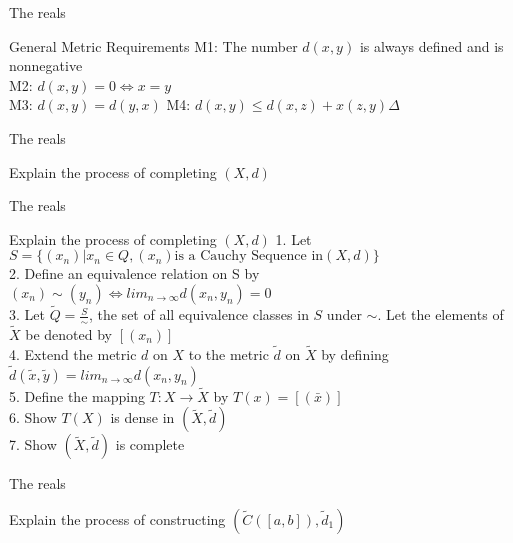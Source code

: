 \documentclass{beamer}
\begin{document}
\begin{frame}{The reals}
        \begin{block}{General Metric Requirements}
		M1: The number $d(x,y)$ is always defined and is nonnegative\\
		M2: $d(x,y) = 0 \iff x = y$\\
		M3: $d(x,y) = d(y,x)$
		M4: $d(x,y) \leq d(x,z) + x(z,y) \Delta$
        \end{block}
\end{frame}

\begin{frame}{The reals}
        \begin{block}{Explain the process of completing $(X,d)$}
        \end{block}
\end{frame}

\begin{frame}{The reals}
        \begin{block}{Explain the process of completing $(X,d)$}
                1. Let $S = \{(x_n)|x_n \in Q, (x_n) \text{is a Cauchy Sequence in} (X,d)\}$\\
                2. Define an equivalence relation on S by $(x_n) \sim (y_n) \iff lim_{n \rightarrow \infty} d(x_n,y_n) =0$\\
                3. Let $\widetilde{Q} = \frac{S}{\sim}$, the set of all equivalence classes in $S$ under $\sim$. Let the elements of $\widetilde{X}$ be denoted by $[(x_n)]$\\
                4. Extend the metric $d$ on $X$ to the metric $\widetilde{d}$ on $\widetilde{X}$ by defining $\widetilde{d}(\widetilde{x},\widetilde{y}) = lim_{n \rightarrow \infty} d(x_n,y_n)$\\
                5. Define the mapping $T: X \rightarrow \widetilde{X}$ by $T(x) = [(\bar{x})]$\\
		6. Show $T(X)$ is dense in $(\widetilde{X},\widetilde{d})$\\
                7. Show $(\widetilde{X},\widetilde{d})$ is complete
        \end{block}
\end{frame}

\begin{frame}{The reals}
	\begin{block}{Explain the process of constructing $(\widetilde{C}([a,b]),\widetilde{d}_1)$}
        \end{block}
\end{frame}
\end{document}
